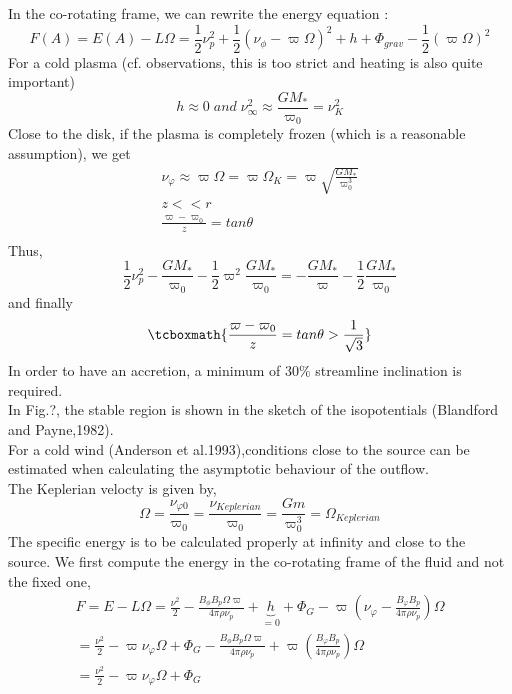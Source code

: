 \documentclass[10pt,a4paper,english]{article}
\begin{document}
In the co-rotating frame, we can rewrite the energy equation :
\begin{equation}
   F(A)=E(A)-L\Omega=\frac{1}{2}\nu_{p}^{2} +\frac{1}{2}(\nu_{\phi} - \varpi\Omega)^{2} + h + \Phi_{grav} - \frac{1}{2}(\varpi\Omega)^{2}
\end{equation}
For a cold plasma (cf. observations, this is too strict and heating is also quite important)
\begin{equation}
 h \approx 0 \; and \; \nu^{2}_{\infty} \approx \frac{GM_{*}}{\varpi_{0}}=\nu^{2}_{K}
\end{equation}
Close to the disk, if the plasma is completely frozen (which is a reasonable assumption), we get
\begin{align*}
   \nu_{\varphi} \approx \varpi\Omega = \varpi\Omega_{K} = \varpi \sqrt{\frac{GM_{*}}{\varpi^{3}_{0}}} \\
   z << r \\
   \frac{\varpi-\varpi_{0}}{z}=tan\theta \\
\end{align*}
Thus,
\begin{equation}
   \frac{1}{2}\nu^{2}_{p}-\frac{GM_{*}}{\varpi_{0}}-\frac{1}{2}\varpi^{2}\frac{GM_{*}}{\varpi_{0}} = -\frac{GM_{*}}{\varpi}-\frac{1}{2}\frac{GM_{*}}{\varpi_{0}}
\end{equation}
and finally
\begin{equation}
    \tcboxmath{
     \frac{\varpi-\varpi_{0}}{z} = tan \theta > \frac{1}{\sqrt{3}}
     }
\end{equation}
In order to have an accretion, a minimum of 30$\%$ streamline inclination is required.
\\
In Fig.?, the stable region is shown in the sketch of the isopotentials (Blandford and Payne,1982).
\\
For a cold wind (Anderson et al.1993),conditions close to the source can be estimated when calculating the asymptotic behaviour of the outflow.
\\
The Keplerian velocty is given by,
\begin{equation}
   \Omega=\frac{\nu_{\varphi0}}{\varpi_{0}}=\frac{\nu_{Keplerian}}{\varpi_{0}}=\frac{Gm}{\varpi^{3}_{0}}=\Omega_{Keplerian}
\end{equation}
The specific energy is to be calculated properly at infinity and close to the source. We first compute the energy in the co-rotating frame of the fluid and not the fixed one,
\begin{align}
   F = E-L\Omega=\frac{\nu^{2}}{2}-\frac{B_{\phi}B_{p}\Omega\varpi}{4\pi\rho\nu_{p}}+\underbrace{h}_{=0}+\Phi_{G}-\varpi(\nu_{\varphi}-\frac{B_{\varphi}B_{p}}{4\pi\rho\nu_{p}})\Omega \\
    = \frac{\nu^{2}}{2}-\varpi\nu_{\varphi}\Omega +\Phi_{G} -\frac{B_{\phi}B_{p}\Omega\varpi}{4\pi\rho\nu_{p}}+\varpi(\frac{B_{\varphi}B_{p}}{4\pi\rho\nu_{p}})\Omega \\
    = \frac{\nu^{2}}{2}-\varpi\nu_{\varphi}\Omega +\Phi_{G} \\
\end{align}
\end{document}
